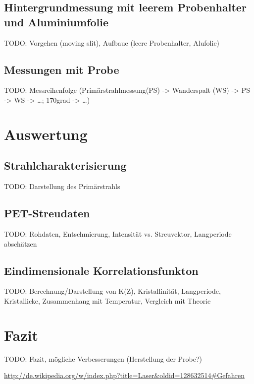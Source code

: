 \documentclass[bigchapter,colorback,accentcolor=tud4b,linedtoc,11pt]{tudreport}
\begin{document}
\section{Hintergrundmessung mit leerem Probenhalter und Aluminiumfolie}
TODO: Vorgehen (moving slit), Aufbaue (leere Probenhalter, Alufolie)

\section{Messungen mit Probe}
TODO: Messreihenfolge (Primärstrahlmessung(PS) -> Wanderspalt (WS) -> PS -> WS -> \dots; 170grad -> \dots)

\chapter{Auswertung}
\section{Strahlcharakterisierung}
TODO: Darstellung des Primärstrahls

\section{PET-Streudaten}
TODO: Rohdaten, Entschmierung, Intensität vs. Streuvektor, Langperiode abschätzen

\section{Eindimensionale Korrelationsfunkton}
TODO: Berechnung/Darstellung von K(Z), Kristallinität, Langperiode, Kristallicke, Zusammenhang mit Temperatur, Vergleich mit Theorie

\chapter{Fazit}
TODO: Fazit, mögliche Verbesserungen (Herstellung der Probe?)

\cleardoublepage{}
\newpage
\begin{thebibliography}{100}
   \url{http://de.wikipedia.org/w/index.php?title=Laser&oldid=128632514#Gefahren}
\end{thebibliography}

\cleardoublepage{}
\end{document}
